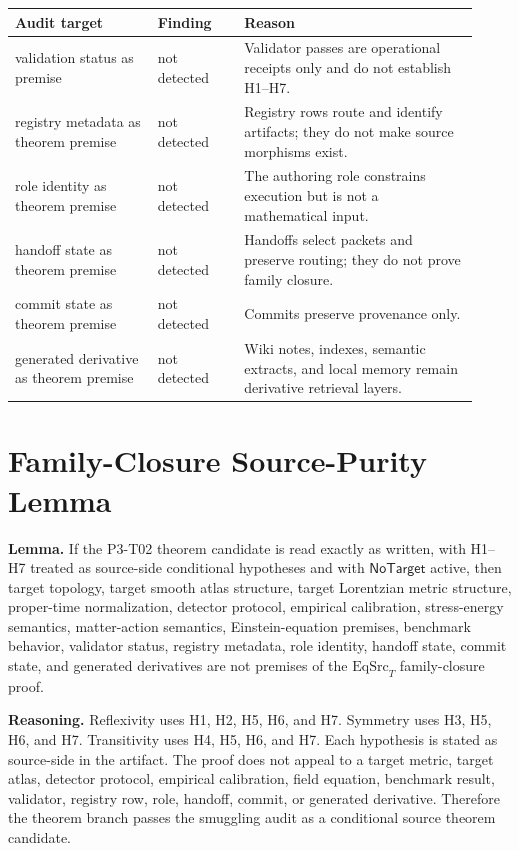 \documentclass[11pt]{article}
\newcommand{\EqSrcT}{\mathrm{EqSrc}_{T}}
\newcommand{\NoTarget}{\mathsf{NoTarget}}
\begin{document}
\begin{longtable}{p{0.29\linewidth}p{0.17\linewidth}p{0.46\linewidth}}
\toprule
Audit target & Finding & Reason \\
\midrule
validation status as premise & not detected & Validator passes are operational receipts only and do not establish H1--H7. \\
registry metadata as theorem premise & not detected & Registry rows route and identify artifacts; they do not make source morphisms exist. \\
role identity as theorem premise & not detected & The authoring role constrains execution but is not a mathematical input. \\
handoff state as theorem premise & not detected & Handoffs select packets and preserve routing; they do not prove family closure. \\
commit state as theorem premise & not detected & Commits preserve provenance only. \\
generated derivative as theorem premise & not detected & Wiki notes, indexes, semantic extracts, and local memory remain derivative retrieval layers. \\
\bottomrule
\end{longtable}

\section{Family-Closure Source-Purity Lemma}

\textbf{Lemma.} If the P3-T02 theorem candidate is read exactly as written,
with H1--H7 treated as source-side conditional hypotheses and with
\(\NoTarget\) active, then target topology, target smooth atlas structure,
target Lorentzian metric structure, proper-time normalization, detector
protocol, empirical calibration, stress-energy semantics, matter-action
semantics, Einstein-equation premises, benchmark behavior, validator status,
registry metadata, role identity, handoff state, commit state, and generated
derivatives are not premises of the \(\EqSrcT\) family-closure proof.

\textbf{Reasoning.} Reflexivity uses H1, H2, H5, H6, and H7. Symmetry uses H3,
H5, H6, and H7. Transitivity uses H4, H5, H6, and H7. Each hypothesis is
stated as source-side in the artifact. The proof does not appeal to a target
metric, target atlas, detector protocol, empirical calibration, field
equation, benchmark result, validator, registry row, role, handoff, commit, or
generated derivative. Therefore the theorem branch passes the smuggling audit
as a conditional source theorem candidate.
\end{document}
